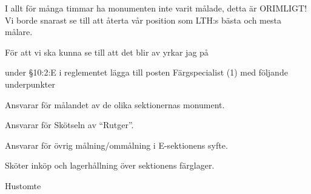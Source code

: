 \documentclass[../_main/handlingar.tex]{subfiles}
\begin{document}
I allt för många timmar ha monumenten inte varit målade, detta är ORIMLIGT! Vi borde
snarast se till att återta vår position som LTH:s bästa och mesta målare.

För att vi ska kunna se till att det blir av yrkar jag på
\begin{attsatser}
    \att under \S10:2:E i reglementet lägga till posten Färgspecialist (1) med följande underpunkter
    \begin{itemizedash}
            \item Ansvarar för målandet av de olika sektionernas monument.
            \item Ansvarar för Skötseln av “Rutger”.
            \item Ansvarar för övrig målning/ommålning i E-sektionens syfte.
            \item Sköter inköp och lagerhållning över sektionens färglager.
     \end{itemizedash}
\end{attsatser}

\begin{signatures}{1}
    \mvh
    \signature{Henrik Ramström}{Hustomte}
\end{signatures}
\end{document}
